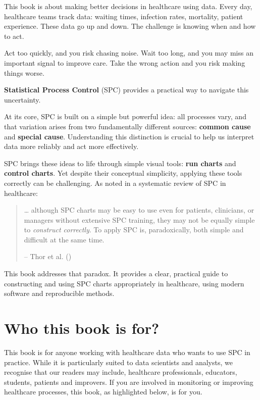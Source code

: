 \documentclass[
]{book}
\begin{document}
This book is about making better decisions in healthcare using data.
Every day, healthcare teams track data: waiting times, infection rates,
mortality, patient experience. These data go up and down. The challenge
is knowing when and how to act.

Act too quickly, and you risk chasing noise. Wait too long, and you may
miss an important signal to improve care. Take the wrong action and you
risk making things worse.

\textbf{Statistical Process Control} (SPC) provides a practical way to
navigate this uncertainty.

At its core, SPC is built on a simple but powerful idea: all processes
vary, and that variation arises from two fundamentally different
sources: \textbf{common cause} and \textbf{special cause}. Understanding
this distinction is crucial to help us interpret data more reliably and
act more effectively.

SPC brings these ideas to life through simple visual tools: \textbf{run
charts} and \textbf{control charts}. Yet despite their conceptual
simplicity, applying these tools correctly can be challenging. As noted
in a systematic review of SPC in healthcare:

\begin{quote}
\ldots{} although SPC charts may be easy to use even for patients,
clinicians, or managers without extensive SPC training, they may not be
equally simple to \emph{construct correctly}. To apply SPC is,
paradoxically, both simple and difficult at the same time.

-- Thor et al. ()
\end{quote}

This book addresses that paradox. It provides a clear, practical guide
to constructing and using SPC charts appropriately in healthcare, using
modern software and reproducible methods.

\section*{Who this book is for?}\label{who-this-book-is-for}

This book is for anyone working with healthcare data who wants to use
SPC in practice. While it is particularly suited to data scientists and
analysts, we recognise that our readers may include, healthcare
professionals, educators, students, patients and improvers. If you are
involved in monitoring or improving healthcare processes, this book, as
highlighted below, is for you.
\end{document}
